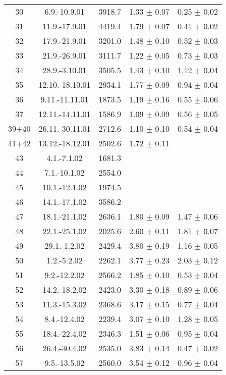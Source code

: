 \documentclass[a4paper,12pt]{article}
\begin{document}
\begin{center}
\begin{longtable}{|c|c|c|c|c|}
    30	&	6.9.-10.9.01	&	3918.7	&	1.33 $\pm$ 0.07	&	0.25 $\pm$ 0.02	\\
    31	&	11.9.-17.9.01	&	4419.4	&	1.79 $\pm$ 0.07	&	0.41 $\pm$ 0.02	\\
    32	&	17.9.-21.9.01	&	3201.0	&	1.48 $\pm$ 0.10	&	0.52 $\pm$ 0.03	\\
    33	&	21.9.-26.9.01	&	3111.7	&	1.22 $\pm$ 0.05	&	0.73 $\pm$ 0.03	\\
    34	&	28.9.-3.10.01	&	3505.5	&	1.43 $\pm$ 0.10	&	1.12 $\pm$ 0.04	\\
    35	&	12.10.-18.10.01	&	2934.1	&	1.77 $\pm$ 0.09	&	0.94 $\pm$ 0.04	\\
    36	&	9.11.-11.11.01	&	1873.5	&	1.19 $\pm$ 0.16	&	0.55 $\pm$ 0.06	\\
    37	&	12.11.-14.11.01	&	1586.9	&	1.09 $\pm$ 0.09	&	0.56 $\pm$ 0.05	\\
    39+40	&	26.11.-30.11.01	&	2712.6	&	1.10 $\pm$ 0.10	&	0.54 $\pm$ 0.04	\\
    41+42	&	13.12.-18.12.01	&	2502.6	&	1.72 $\pm$ 0.11	&		\\
    43	&	4.1.-7.1.02	&	1681.3	&		&		\\
    44	&	7.1.-10.1.02	&	2554.0	&		&		\\
    45	&	10.1.-12.1.02	&	1974.5	&		&		\\
    46	&	14.1.-17.1.02	&	3586.2	&		&		\\
    47	&	18.1.-21.1.02	&	2636.1	&	1.80 $\pm$ 0.09	&	1.47 $\pm$ 0.06	\\
    48	&	22.1.-25.1.02	&	2025.6	&	2.60 $\pm$ 0.11	&	1.81 $\pm$ 0.07	\\
    49	&	29.1.-1.2.02	&	2429.4	&	3.80 $\pm$ 0.19	&	1.16 $\pm$ 0.05	\\
    50	&	1.2.-5.2.02	&	2262.1	&	3.77 $\pm$ 0.23	&	2.03 $\pm$ 0.12	\\
    51	&	9.2.-12.2.02	&	2566.2	&	1.85 $\pm$ 0.10	&	0.53 $\pm$ 0.04	\\
    52	&	14.2.-18.2.02	&	2423.0	&	3.30 $\pm$ 0.18	&	0.89 $\pm$ 0.06	\\
    53	&	11.3.-15.3.02	&	2368.6	&	3.17 $\pm$ 0.15	&	0.77 $\pm$ 0.04	\\
    54	&	8.4.-12.4.02	&	2239.4	&	3.07 $\pm$ 0.10	&	1.28 $\pm$ 0.05	\\
    55	&	18.4.-22.4.02	&	2346.3	&	1.51 $\pm$ 0.06	&	0.95 $\pm$ 0.04	\\
    56	&	26.4.-30.4.02	&	2535.0	&	3.83 $\pm$ 0.14	&	0.47 $\pm$ 0.02	\\
    57	&	9.5.-13.5.02	&	2560.0	&	3.54 $\pm$ 0.12	&	0.96 $\pm$ 0.04	\\

\end{longtable}
\end{center}
\end{document}
